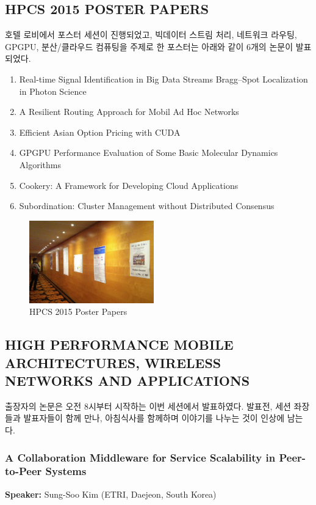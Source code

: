 \documentclass[twocolumn]{article}
\newcommand{\be}{\begin{enumerate}}
\newcommand{\ee}{\end{enumerate}}
\newcommand{\ii}{\item}
\begin{document}
\subsection{HPCS 2015 POSTER PAPERS}
호텔 로비에서 포스터 세션이 진행되었고, 빅데이터 스트림 처리, 네트워크 라우팅, GPGPU, 분산/클라우드 컴퓨팅을 주제로 한 포스터는 아래와 같이 6개의 논문이 발표되었다.  
\be
\ii Real-time Signal Identification in Big Data Streams Bragg–Spot Localization in Photon Science
\ii A Resilient Routing Approach for Mobil Ad Hoc Networks
\ii Efficient Asian Option Pricing with CUDA
\ii GPGPU Performance Evaluation of Some Basic Molecular Dynamics Algorithms
\ii Cookery: A Framework for Developing Cloud Applications
\ii Subordination: Cluster Management without Distributed Consensus
\ee

\begin{figure}[htb]
        \centering
        \includegraphics[width=0.48\textwidth]{posters.png}
        \caption{HPCS 2015 Poster Papers}
        \label{fig:posters}
\end{figure}

\subsection{HIGH PERFORMANCE MOBILE ARCHITECTURES, WIRELESS NETWORKS AND APPLICATIONS}
%
%
%
%
출장자의 논문은 오전 8시부터 시작하는 이번 세션에서 발표하였다.  발표전, 세션 좌장들과 발표자들이 함께 만나, 아침식사를 함께하며 이야기를 나누는 것이 인상에 남는다.

\subsubsection{A Collaboration Middleware for Service Scalability in Peer-to-Peer Systems}
\textbf{Speaker:} Sung-Soo Kim (ETRI, Daejeon, South Korea)
\end{document}

